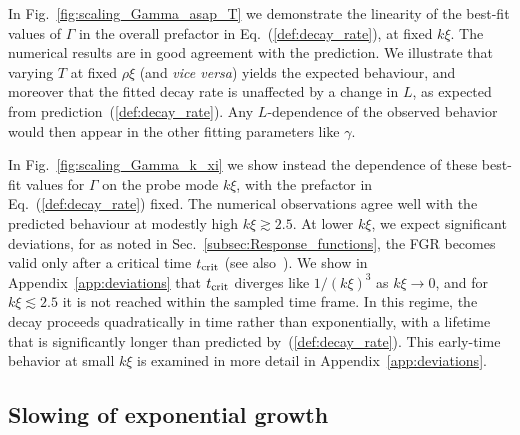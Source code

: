 \documentclass[aps,prd,notitlepage,amsfonts,amssymb,amsmath,nofootinbib,superscriptaddress,longbibliography]{revtex4-2}
\begin{document}
In Fig.~\ref{fig:scaling_Gamma_asap_T} we demonstrate the linearity of the best-fit values of $\Gamma$ in the overall prefactor in Eq.~(\ref{def:decay_rate}), at fixed $k\xi$.  The numerical results are in good agreement with the prediction.  We illustrate that varying $T$ at fixed $\rho\xi$ (and {\it vice versa}) yields the expected behaviour, and moreover that the fitted decay rate is unaffected by a change in $L$, as expected from prediction~(\ref{def:decay_rate}).  Any $L$-dependence of the observed behavior would then appear in the other fitting parameters like $\gamma$.

In Fig.~\ref{fig:scaling_Gamma_k_xi} we show instead the dependence of these best-fit values for $\Gamma$ on the probe mode $k\xi$, with the prefactor in Eq.~(\ref{def:decay_rate}) fixed.  The numerical observations agree well with the predicted behaviour at modestly high $k\xi \gtrsim 2.5$.
At lower $k\xi$, we expect significant deviations, for as noted in Sec.~\ref{subsec:Response_functions},
the FGR becomes valid only after a critical time $t_{\rm crit}$ (see also~\cite{CohenTannoudji2020,Peres1980}). We show in Appendix~\ref{app:deviations} that $t_{\rm crit}$ diverges like $1/\left(k\xi\right)^{3}$ as $k\xi \to 0$, and for $k\xi \lesssim 2.5$ it is not reached within the sampled time frame. In this regime, the decay proceeds quadratically in time rather than exponentially, with a lifetime that is significantly longer than predicted by~(\ref{def:decay_rate}). This early-time behavior at small $k\xi$ is examined in more detail in Appendix~\ref{app:deviations}.


\subsection{Slowing of exponential growth}
\label{subsec:slowing_of_exponential_growth}
\end{document}
